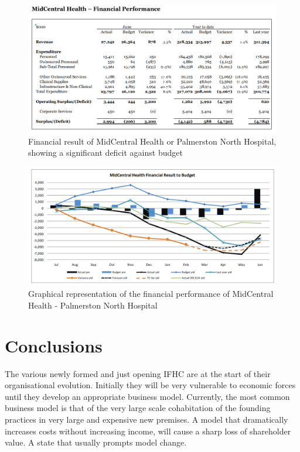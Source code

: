 \documentclass[11pt,a4paper]{article}
\begin{document}
\begin{figure}[htp]
\centering
\includegraphics[scale=0.30]{MCHbalance.png}
\caption{Financial result of MidCentral Health or Palmerston North Hospital, showing a significant deficit against budget }
\label{Financial result for MidCentral Health - Palmerston North Hospital}
\end{figure}

\begin{figure}[htp]
\centering
\includegraphics[scale=0.30]{MCHgraph.png}
\caption{Graphical representation of the financial performance of MidCentral Health - Palmerston North Hospital}
\label{}
\end{figure}

\pagebreak

\section{Conclusions}
The various newly formed and just opening IFHC are at the start of their organisational evolution. Initially they will be very vulnerable to economic forces until they develop an appropriate business model. Currently, the most common business model is that of the very large scale cohabitation of the founding practices in very large and expensive new premises. A model that dramatically increases costs without increasing income, will cause a sharp loss of shareholder value. A state that usually prompts model change. \\
\end{document}
